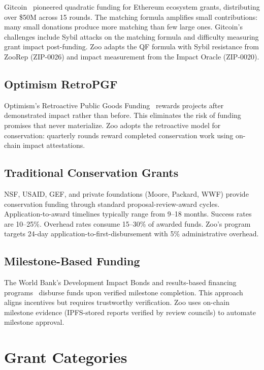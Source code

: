 \documentclass[11pt,letterpaper]{article}
\begin{document}
Gitcoin~\cite{gitcoin2023} pioneered quadratic funding for Ethereum ecosystem grants, distributing over \$50M across 15 rounds. The matching formula amplifies small contributions: many small donations produce more matching than few large ones. Gitcoin's challenges include Sybil attacks on the matching formula and difficulty measuring grant impact post-funding. Zoo adapts the QF formula with Sybil resistance from ZooRep (ZIP-0026) and impact measurement from the Impact Oracle (ZIP-0020).

\subsection{Optimism RetroPGF}

Optimism's Retroactive Public Goods Funding~\cite{optimism2023retropgf} rewards projects after demonstrated impact rather than before. This eliminates the risk of funding promises that never materialize. Zoo adopts the retroactive model for conservation: quarterly rounds reward completed conservation work using on-chain impact attestations.

\subsection{Traditional Conservation Grants}

NSF, USAID, GEF, and private foundations (Moore, Packard, WWF) provide conservation funding through standard proposal-review-award cycles. Application-to-award timelines typically range from 9--18 months. Success rates are 10--25\%. Overhead rates consume 15--30\% of awarded funds. Zoo's program targets 24-day application-to-first-disbursement with 5\% administrative overhead.

\subsection{Milestone-Based Funding}

The World Bank's Development Impact Bonds and results-based financing programs~\cite{worldbank2019rbf} disburse funds upon verified milestone completion. This approach aligns incentives but requires trustworthy verification. Zoo uses on-chain milestone evidence (IPFS-stored reports verified by review councils) to automate milestone approval.

\section{Grant Categories}
\label{sec:categories}
\end{document}

